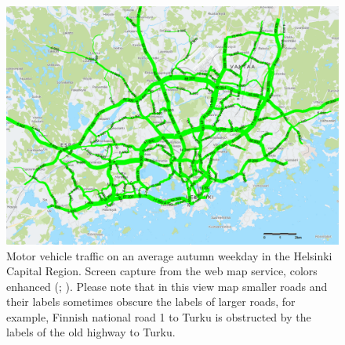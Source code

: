 \begin{figure}[H]%
    \includegraphics[width=\textwidth]{images/traffic_amount_autumn2018.png}
    \caption[Motor vehicle traffic on main roads in Helsinki Capital Region]{Motor vehicle traffic on an average autumn weekday in the Helsinki Capital Region. Screen capture from the web map service, colors enhanced (\cite{Helsinginseudunliikenne2019}; \cite{OpenStreetMap}). Please note that in this view map smaller roads and their labels sometimes obscure the labels of larger roads, for example, Finnish national road 1 to Turku is obstructed by the labels of the old highway to Turku.}%
    \label{fig:traffic_amount_autumn2018}%
\end{figure}

